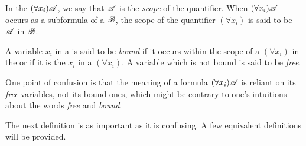 \setcounter{definition}{7}
\begin{definition}
  In the \wf{} \((\forall x_i)\mathscr{A}\), we say that \(\mathscr{A}\) is the \textit{scope} of the quantifier. When \((\forall x_i)\mathscr{A}\) occurs as a subformula of a \wf{} \(\mathscr{B}\), the scope of the quantifier \((\forall x_i)\) is said to be \(\mathscr{A}\) in \(\mathscr{B}\).

  A variable \(x_i\) in a \wf{} is said to be \textit{bound} if it occurs within the scope of a \((\forall x_i)\) in the \wf{} or if it is the \(x_i\) in a \((\forall x_i)\). A variable which is not bound is said to be \textit{free}.

  \note{} One point of confusion is that the meaning of a formula \((\forall x_i) \mathscr{A}\) is reliant on its \textit{free} variables, not its bound ones, which might be contrary to one's intuitions about the words \textit{free} and \textit{bound}.
\end{definition}

The next definition is as important as it is confusing. A few equivalent definitions will be provided.

